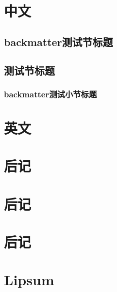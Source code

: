 \documentclass[color=blue]{textbook-cn}%
\begin{document}
\begin{Test}

\chapter[PPPPPLLL]{中文}
\thepart\zhlipsum

\section{backmatter测试节标题}
\section{测试节标题}

\subsection{backmatter测试小节标题}


\begin{Definition}[定义名称]
	\lipsum[2]
\end{Definition}




\chapter{英文}
\zhlipsum
\end{Test}



\chapter{后记}
\thechapter
\zhlipsum\zhlipsum


\begin{Definition}[定义名称]
	\lipsum[1]
\end{Definition}




\chapter[我爱你]{后记}
\thechapter
\zhlipsum\zhlipsum
\chapter*{后记}



\chapter*[我讨厌你]{Lipsum}
\zhlipsum\zhlipsum
\end{document}
